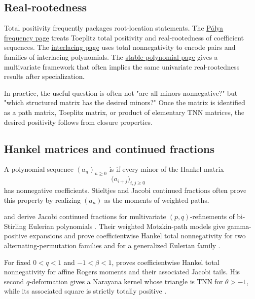 \subsection[totalPositivityRealRootedness]{Real-rootedness}

Total positivity frequently packages root-location statements.  The
\hyperref[polyaFrequency]{Pólya frequency page} treats Toeplitz total
positivity and real-rootedness of coefficient sequences.  The
\hyperref[interlacingPolynomials]{interlacing page} uses total
nonnegativity to encode pairs and families of interlacing polynomials.  The
\hyperref[stablePolynomial]{stable-polynomial page} gives a multivariate
framework that often implies the same univariate real-rootedness results
after specialization.

In practice, the useful question is often not "are all minors nonnegative?"
but "which structured matrix has the desired minors?"  Once the matrix is
identified as a path matrix, Toeplitz matrix, or product of elementary TNN
matrices, the desired positivity follows from closure properties.

\subsection[hankelTotalPositivityContinuedFractions]{Hankel matrices and continued fractions}

A polynomial sequence \((a_n)_{n\geq0}\) is
\label{hankelTNN}
if every minor of the Hankel matrix
\[
  \bigl(a_{i+j}\bigr)_{i,j\geq0}
\]
has nonnegative coefficients.  Stieltjes and Jacobi continued fractions often
prove this property by realizing \((a_n)\) as the moments of weighted paths.

 and  derive Jacobi continued fractions for
multivariate \((p,q)\)-refinements of bi-Stirling Eulerian polynomials
\cite{XuZeng2026x}.  Their weighted Motzkin-path models give gamma-positive
expansions and prove coefficientwise Hankel total nonnegativity for two
alternating-permutation families and for a generalized Eulerian family
\cite[Thms.~7.2, 7.4, and~7.7]{XuZeng2026x}.

For fixed $0<q<1$ and $-1<\beta<1$,  proves
coefficientwise Hankel total nonnegativity for affine Rogers moments and their
associated Jacobi tails.  His second $q$-deformation gives a Narayana kernel
whose triangle is TNN for $\theta>-1$, while its associated square is strictly
totally positive
\cite[Thm.~2.1 and Thms.~12.1, 12.3]{Zeng2026qNarayana}.

